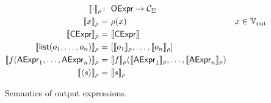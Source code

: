 \begin{figure}
    \centering
    \begin{align*}
        \semO{ \cdot }{\rho}       \colon&~ \oexpr \to \OutputType \\
        \semO{x}{\rho}                  =&~ \rho(x) & x \in \OVars \\
        \semO{\cexpr}{\rho}             =&~ \semC{\cexpr} \\
        \semO{\olist{o_1, \ldots, o_n}}{\rho} =&~ [\semO{o_1}{\rho}, \ldots, \semO{o_n}{\rho}] \\
        \semO{f(\aexpr_1, \dots, \aexpr_n)}{\rho} =&~ \semF{f}{\rho}(\semO{\aexpr_1}{\rho}, \dots, \semO{\aexpr_n}{\rho}) \\
        \semO{\ogen{s}}{\rho}           =&~ \semS{s}{\rho}
    \end{align*}
    \caption{Semantics of output expressions.}
\end{figure}
